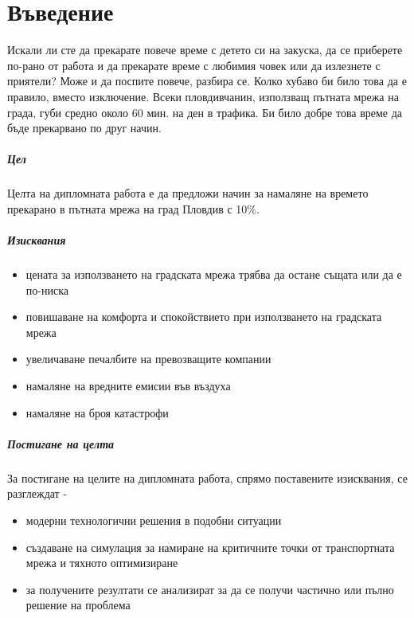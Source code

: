 \chapter{Въведение}

	Искали ли сте да прекарате повече време с детето си на закуска, 
	да се приберете по-рано от работа и да прекарате време с любимия човек или да излезнете с приятели? 
	Може и да поспите повече, разбира се. Колко хубаво би било това да е правило, вместо изключение.
	Всеки пловдивчанин, използващ пътната мрежа на града, губи средно около 60 мин. на ден в трафика.
	Би било добре това време да бъде прекарвано по друг начин.

	\paragraph{Цел}

	Целта на дипломната работа е да предложи начин за намаляне на времето прекарано в пътната мрежа на град Пловдив с 10\%. 

	\paragraph{Изисквания}

		\begin{itemize}
			\item цената за използването на градската мрежа трябва да остане същата или да е по-ниска
			\item повишаване на комфорта и спокойствието при използването на градската мрежа
			\item увеличаване печалбите на превозващите компании
			\item намаляне на вредните емисии във въздуха
			\item намаляне на броя катастрофи
		\end{itemize}

	\paragraph{Постигане на целта}

		За постигане на целите на дипломната работа, спрямо поставените изисквания, се разглеждат - 
	
		\begin{itemize}
			\item модерни технологични решения в подобни ситуации
			\item създаване на симулация за намиране на критичните точки от транспортната мрежа и тяхното оптимизиране
			\item за получените резултати се анализират за да се получи частично или пълно решение на проблема
		\end{itemize}


